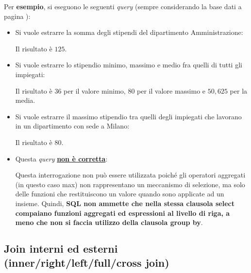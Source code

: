 \documentclass[a4paper]{article}
\begin{document}
	\noindent
	Per \textcolor{Green4}{\textbf{esempio}}, si eseguono le seguenti \emph{query} (sempre considerando la base dati a pagina \pageref{img: select dbms}):
	\begin{itemize}
		\item Si vuole estrarre la somma degli stipendi del dipartimento Amministrazione:
		
		Il risultato è $125$.
		
		\item Si vuole estrarre lo stipendio minimo, massimo e medio fra quelli di tutti gli impiegati:
		
		Il risultato è $36$ per il valore minimo, $80$ per il valore massimo e $50,625$ per la media.
		
		\item Si vuole estrarre il massimo stipendio tra quelli degli impiegati che lavorano in un dipartimento con sede a Milano:
		
		Il risultato è $80$.
		
		\item Questa \emph{query} \underline{\textbf{non è corretta}}:
		
		Questa interrogazione non può essere utilizzata poiché gli operatori aggregati (in questo caso \textsf{max}) non rappresentano un meccanismo di selezione, ma solo delle funzioni che restituiscono un valore quando sono applicate ad un insieme. Quindi, \textbf{SQL non ammette che nella stessa clausola \textsf{select} compaiano funzioni aggregati ed espressioni al livello di riga, a meno che non si faccia utilizzo della clausola \textsf{group by}}.
	\end{itemize}\newpage

	\subsection{Join interni ed esterni (\textsf{inner/right/left/full/cross join})}
	
\end{document}
